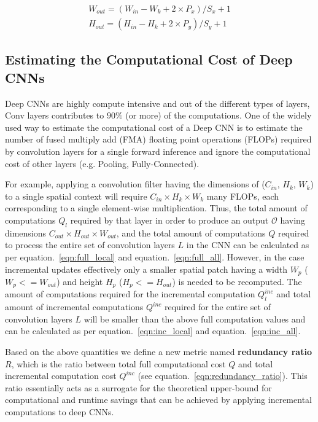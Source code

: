 \begin{align}
W_{out} = (W_{in} - W_k + 2\times P_x)/S_x + 1 \\
H_{out} = (H_{in} - H_k + 2\times P_y)/S_y + 1
\end{align}

\subsection{Estimating the Computational Cost of Deep CNNs}
Deep CNNs are highly compute intensive and out of the different types of layers, Conv layers contributes to $90\%$ (or more) of the computations. One of the widely used way to estimate the computational cost of a Deep CNN is to estimate the number of fused multiply add (FMA) floating point operations (FLOPs) required by convolution layers for a single forward inference and ignore the computational cost of other layers (e.g. Pooling, Fully-Connected).

For example, applying a convolution filter having the dimensions of ($C_{in}$, $H_{k}$, $W_{k}$) to a single spatial context will require $C_{in} \times H_{k} \times W_{k}$ many FLOPs, each corresponding to a single element-wise multiplication. Thus, the total amount of computations $Q_l$ required by that layer in order to produce an output $\mathcal{O}$ having dimensions $C_{out} \times H_{out} \times W_{out}$, and the total amount of computations $Q$ required to process the entire set of convolution layers $L$ in the CNN can be calculated as per equation.~\ref{eqn:full_local} and equation.~\ref{eqn:full_all}. However, in the case incremental updates effectively only a smaller spatial patch having a width $W_p$ ($W_p<=W_{out}$) and height $H_p$ ($H_p<=H_{out}$) is needed to be recomputed. The amount of computations required for the incremental computation $Q_l^{inc}$ and total amount of incremental computations $Q^{inc}$ required for the entire set of convolution layers $L$ will be smaller than the above full computation values and can be calculated as per equation.~\ref{eqn:inc_local} and equation.~\ref{eqn:inc_all}.

Based on the above quantities we define a new metric named \textbf{redundancy ratio} $R$, which is the ratio between total full computational cost $Q$ and total incremental computation cost $Q^{inc}$ (see equation.~\ref{eqn:redundancy_ratio}). This ratio essentially acts as a surrogate for the theoretical upper-bound for computational and runtime savings that can be achieved by applying incremental computations to deep CNNs.

